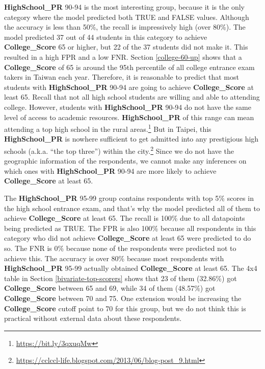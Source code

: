 \documentclass[
]{article}
\begin{document}
\textbf{HighSchool\_PR} 90-94 is the most interesting group, because it
is the only category where the model predicted both TRUE and FALSE
values. Although the accuracy is less than 50\%, the recall is
impressively high (over 80\%). The model predicted 37 out of 44 students
in this category to achieve \textbf{College\_Score} 65 or higher, but 22
of the 37 students did not make it. This resulted in a high FPR and a
low FNR. Section \ref{college-60-up} shows that a
\textbf{College\_Score} of 65 is around the 95th percentile of all
college entrance exam takers in Taiwan each year. Therefore, it is
reasonable to predict that most students with \textbf{HighSchool\_PR}
90-94 are going to achieve \textbf{College\_Score} at least 65. Recall
that not all high school students are willing and able to attending
college. However, students with \textbf{HighSchool\_PR} 90-94 do not
have the same level of access to academic resources.
\textbf{HighSchool\_PR} of this range can mean attending a top high
school in the rural areas.\footnote{\url{https://bit.ly/3qxuqMw}} But in
Taipei, this \textbf{HighSchool\_PR} is nowhere sufficient to get
admitted into any prestigious high schools (a.k.a. ``the top three'')
within the city.\footnote{\url{https://cclccl-life.blogspot.com/2013/06/blog-post_9.html}}
Since we do not have the geographic information of the respondents, we
cannot make any inferences on which ones with \textbf{HighSchool\_PR}
90-94 are more likely to achieve \textbf{College\_Score} at least 65.

The \textbf{HighSchool\_PR} 95-99 group contains respondents with top
5\% scores in the high school entrance exam, and that's why the model
predicted all of them to achieve \textbf{College\_Score} at least 65.
The recall is 100\% due to all datapoints being predicted as TRUE. The
FPR is also 100\% because all respondents in this category who did not
achieve \textbf{College\_Score} at least 65 were predicted to do so. The
FNR is 0\% because none of the respondents were predicted not to achieve
this. The accuracy is over 80\% because most respondents with
\textbf{HighSchool\_PR} 95-99 actually obtained \textbf{College\_Score}
at least 65. The 4x4 table in Section \ref{bivariate-top-scorers} shows
that 23 of them (32.86\%) got \textbf{College\_Score} between 65 and 69,
while 34 of them (48.57\%) got \textbf{College\_Score} between 70 and
75. One extension would be increasing the \textbf{College\_Score} cutoff
point to 70 for this group, but we do not think this is practical
without external data about these respondents.
\end{document}
